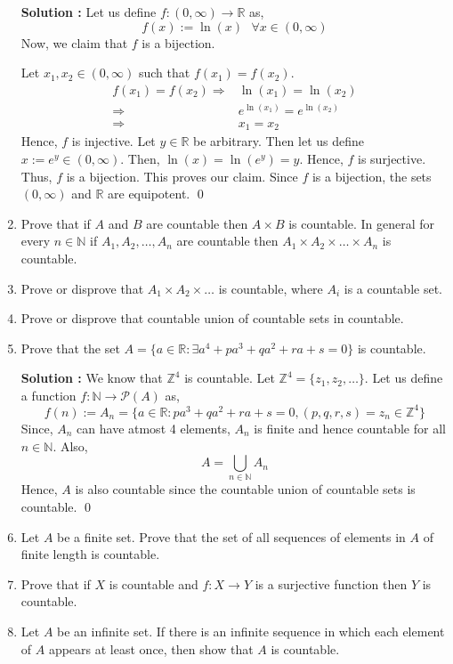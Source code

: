 \documentclass[10pt]{article}
\newcommand{\nn}{\mathbb{N}}
\newcommand{\rn}{\mathbb{R}}
\newcommand{\p}{\mathcal{P}}
\newcommand{\z}{\mathbb{Z}}
\begin{document}
\begin{enumerate}
    \textbf{Solution : }Let us define $f : (0, \infty) \to \rn$ as, $$f(x) := \ln(x) \,\,\,\, \forall x \in (0, \infty)$$ Now, we claim that $f$ is a bijection. 

    Let $x_1, x_2 \in (0, \infty)$ such that $f(x_1) = f(x_2)$. 
    \begin{align*}
        f(x_1) = f(x_2)
        \Rightarrow &\ln(x_1) = \ln(x_2) \\
        \Rightarrow &e^{\ln(x_1)} = e^{\ln(x_2)} \\
        \Rightarrow &x_1 = x_2
    \end{align*}
    Hence, $f$ is injective. Let $y \in \rn$ be arbitrary. Then let us define $x := e^y \in (0, \infty)$. Then, $\ln(x) = \ln(e^y) = y$. Hence, $f$ is surjective. Thus, $f$ is a bijection. This proves our claim. Since $f$ is a bijection, the sets $(0, \infty)$ and $\rn$ are equipotent. \qed
    \item Prove that if $A$ and $B$ are countable then $A \times B$ is countable. In general for every $n \in \nn$ if $A_1, A_2, \dots , A_n$ are countable then $A_1 \times A_2 \times \dots \times A_n$ is countable.
    \item Prove or disprove that $A_1 \times A_2 \times \dots$ is countable, where $A_i$ is a countable set.
    \item Prove or disprove that countable union of countable sets in countable.
    \item Prove that the set $A = \{ a \in \rn : \exists a^4 + pa^3 + qa^2 + ra + s = 0 \}$ is countable.
    
    \textbf{Solution : }We know that $\z^4$ is countable. Let $\z^4 = \{z_1, z_2, \dots \}$. Let us define a function $f : \nn \to \p(A)$ as, $$f(n) := A_n = \{a \in \rn : pa^3 + qa^2 + ra + s = 0, (p,q,r,s) = z_n \in \z^4 \}$$ Since, $A_n$ can have atmost 4 elements, $A_n$ is finite and hence countable for all $n \in \nn$. Also, $$A = \bigcup_{n\in\nn} A_n$$ Hence, $A$ is also countable since the countable union of countable sets is countable. \qed
    \item Let $A$ be a finite set. Prove that the set of all sequences of elements in $A$ of finite length is countable.
    \item Prove that if $X$ is countable and $f : X \to Y$ is a surjective function then $Y$ is countable.
    \item Let $A$ be an infinite set. If there is an infinite sequence in which each element of $A$ appears at least once, then show that $A$ is countable.
    

\end{enumerate}
\end{document}
